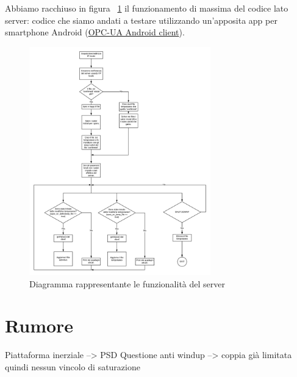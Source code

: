 Abbiamo racchiuso in figura ~\ref{fig:OPCUA_diagram} il funzionamento di massima del codice lato server: codice che siamo andati a testare utilizzando un'apposita app per smartphone Android (\href{https://play.google.com/store/apps/details?id=com.prosysopc.ua.android2&hl=it}{OPC-UA Android client}).

\begin{figure}[h]
	\centering   	
	\includegraphics[width=0.7\textwidth]{Immagini/OPCUA_diagram.jpeg}
	\caption{Diagramma rappresentante le funzionalità del server}
	\label{fig:OPCUA_diagram}
\end{figure}

\section{Rumore}
Piattaforma inerziale --> PSD
Questione anti windup --> coppia già limitata quindi nessun vincolo di saturazione
